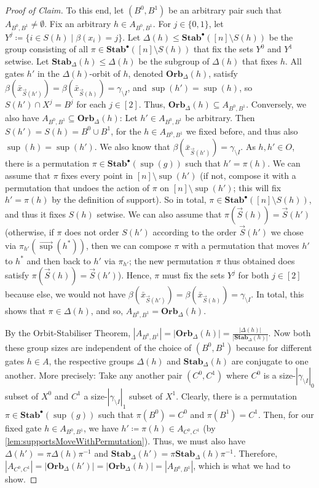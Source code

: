 \documentclass[11pt]{article}
\DeclareMathOperator{\supp}{sup}
\newcommand{\Stab}{\mathbf{Stab}}
\newcommand{\StabP}{\mathbf{Stab}^{\bullet}}
\newcommand{\Orb}{\mathbf{Orb}}
\theoremstyle{definition}
\theoremstyle{plain}
\theoremstyle{remark}
\newenvironment{claimproof}[1][Proof of Claim]{\begin{proof}[#1] \renewcommand{\qedsymbol}{$\lrcorner$}}{ \end{proof}}
\theoremstyle{remark}
\begin{document}
\begin{claimproof}
	To this end, let $(B^0, B^1)$ be an arbitrary pair such that $A_{B^0,B^1} \neq \emptyset$. 
	Fix an arbitrary $h \in A_{B^0,B^1}$. For $j \in \{0,1\}$, let $Y^j  \coloneqq \{ i \in S(h) \mid \beta(x_i) = j\}$.
	Let $\Delta(h) \leq \StabP([n] \setminus S(h))$ be the group consisting of all $\pi \in \StabP([n] \setminus S(h))$ that fix the sets $Y^0$ and $Y^1$ setwise. Let $\Stab_\Delta(h) \leq \Delta(h)$ be the subgroup of $\Delta(h)$ that fixes $h$. 
	All gates $h'$ in the $\Delta(h)$-orbit of $h$, denoted $\Orb_\Delta(h)$, satisfy $\beta(\bar{x}_{\vec{S}(h')}) =  \beta(\bar{x}_{\vec{S}(h)}) = \gamma_{\setminus I}$, and $\supp(h') = \supp(h)$, so $S(h') \cap X^j = B^j$ for each $j \in [2]$. Thus, $\Orb_\Delta(h) \subseteq A_{B^0,B^1}$. Conversely, we also have $A_{B^0,B^1} \subseteq \Orb_\Delta(h)$: Let $h' \in A_{B^0,B^1}$ be arbitrary. Then $S(h') = S(h) = B^0 \cup B^1$, for the $h \in  A_{B^0,B^1}$ we fixed before, and thus also $\supp(h) = \supp(h')$. We also know that $\beta(\bar{x}_{\vec{S}(h')}) = \gamma_{\setminus I}$. As $h,h' \in O$, there is a permutation $\pi \in \StabP(\supp(g))$ such that $h' = \pi(h)$. We can assume that $\pi$ fixes every point in $[n] \setminus \supp(h')$ (if not, compose it with a permutation that undoes the action of $\pi$ on $[n] \setminus \supp(h')$; this will fix $h' = \pi(h)$ by the definition of support). So in total, $\pi \in \StabP([n] \setminus S(h))$, and thus it fixes $S(h)$ setwise.
	We can also assume that $\pi(\vec{S}(h))= \vec{S}(h')$ (otherwise, if $\pi$ does not order $S(h')$ according to the order $\vec{S}(h')$ we chose via $\pi_{h'}(\vec{\supp}(h^*))$, then we can compose $\pi$ with a permutation that moves $h'$ to $h^*$ and then back to $h'$ via $\pi_{h'}$; the new permutation $\pi$ thus obtained does satisfy $\pi(\vec{S}(h))= \vec{S}(h')$).
	Hence, $\pi$ must fix the sets $Y^j$ for both $j \in [2]$ because else, we would not have $\beta(\bar{x}_{\vec{S}(h')}) = \beta(\bar{x}_{\vec{S}(h)}) = \gamma_{\setminus I}$.
	In total, this shows that $\pi \in \Delta(h)$, and so, $A_{B^0,B^1} = \Orb_\Delta(h)$.
	
	By the Orbit-Stabiliser Theorem, $|A_{B^0,B^1}| =  |\Orb_\Delta(h)| = \frac{|\Delta(h)|}{|\Stab_\Delta(h)|}$.  
	Now both these group sizes are independent of the choice of $(B^0, B^1)$ because for different gates $h \in A$, the respective groups $\Delta(h)$ and $\Stab_\Delta(h)$ are conjugate to one another.
	More precisely: Take any another pair $(C^0,C^1)$ where $C^0$ is a size-$|\gamma_{\setminus I}|_0$ subset of $X^0$ and $C^1$ a size-$|\gamma_{\setminus I}|_1$ subset of $X^1$. Clearly, there is a permutation $\pi \in \StabP(\supp(g))$ such that $\pi(B^0) = C^0$ and $\pi(B^1) = C^1$. Then, for our fixed gate $h \in A_{B^0,B^1}$, we have $h' \coloneqq \pi(h) \in A_{C^0,C^1}$ (by \cref{lem:supportsMoveWithPermutation}). Thus, we must also have $\Delta(h') = \pi \Delta(h) \pi^{-1}$ and $\Stab_\Delta(h') = \pi \Stab_\Delta(h) \pi^{-1}$. Therefore, $|A_{C^0,C^1}| = |\Orb_\Delta(h')| =  |\Orb_\Delta(h)| = |A_{B^0,B^1}|$, which is what we had to show.
	

\end{claimproof}
\end{document}
